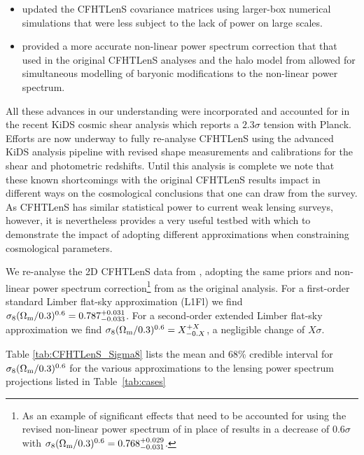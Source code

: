 \begin{itemize}
\item{\citet{joudaki/etal:2016} updated the CFHTLenS covariance matrices using larger-box numerical simulations that were less subject to the lack of power on large scales.}
\item{\cite{2012ApJ...761..152T} provided a more accurate non-linear power spectrum correction that that used in the original CFHTLenS analyses and the halo model from \cite{2015MNRAS.454.1958M} allowed for simultaneous modelling of baryonic modifications to the non-linear power spectrum.} 
\end{itemize}
All these advances in our understanding were incorporated and accounted for in the recent KiDS cosmic shear analysis \citep{KiDS-450} which reports a $2.3 \sigma$ tension with Planck.  Efforts are now underway to fully re-analyse CFHTLenS using the advanced KiDS analysis pipeline with revised shape measurements and calibrations for the shear and photometric redshifts.  Until this analysis is complete we note that these known shortcomings with the original CFHTLenS results impact in different ways on the cosmological conclusions that one can draw from the survey.  As CFHTLenS has similar statistical power to current weak lensing surveys, however, it is nevertheless provides a very useful testbed with which to demonstrate the impact of adopting different approximations when constraining cosmological parameters.

We re-analyse the 2D CFHTLenS data from \cite{CFHTLenS-2pt-notomo}, adopting the same priors and non-linear power spectrum correction\footnote{As an example of significant effects that need to be accounted for using the revised non-linear power spectrum of \cite{2012ApJ...761..152T} in place of \cite{2003MNRAS.341.1311S} results in a decrease of $0.6 \sigma$ with $\sigma_8 (\Omega_{\rm m}/0.3)^{0.6} =0.768^{+0.029}_{-0.031}$.} from \cite{2003MNRAS.341.1311S} as the original \cite{CFHTLenS-2pt-notomo} analysis.  For a first-order standard Limber flat-sky approximation (L1Fl) we find $\sigma_8 (\Omega_{\rm m}/0.3)^{0.6} =0.787^{+0.031}_{-0.033}$.   For a second-order extended Limber flat-sky approximation we find $\sigma_8 (\Omega_{\rm m}/0.3)^{0.6} =X^{+X}_{-0.X}$, a negligible change of $X\sigma$. 

Table \ref{tab:CFHTLenS_Sigma8} lists the mean and 68\% credible interval for $\sigma_8 (\Omega_{\rm m}/0.3)^{0.6}$ for the various approximations to the lensing
power spectrum projections listed in Table~\ref{tab:cases}

